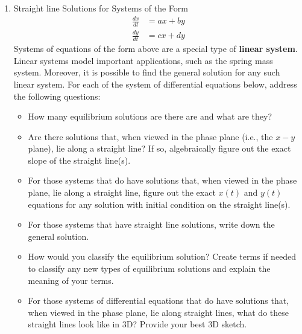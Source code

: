\begin{enumerate}[resume]
\begin{enumerate}
\item Straight line Solutions for Systems of the Form 
\begin{align*}
\frac{dx}{dt}&=ax+by\\
\frac{dy}{dt}&=cx+dy
\end{align*}
Systems of equations of the form above are a special type of \textbf{linear system}. Linear systems model important applications, such as the spring mass system. Moreover, it is possible to find the general solution for any such linear system. For each of the system of differential equations below, address the following questions: \label{12HWproblem2}
\begin{itemize}

\item	How many equilibrium solutions are there are and what are they?

\item	Are there solutions that, when viewed in the phase plane (i.e., the $ x-y$ plane), lie along a straight line? If so, algebraically figure out the exact slope of the straight line(s). 

\item	For those systems that do have solutions that, when viewed in the phase plane, lie along a straight line, figure out the exact $x(t)$ and $y(t)$ equations for any solution with initial condition on the straight line(s). 

\item	For those systems that have straight line solutions, write down the general solution.

\item	How would you classify the equilibrium solution? Create terms if needed to classify any new types of equilibrium solutions and explain the meaning of your terms.

\item	For those systems of differential equations that do have solutions that, when viewed in the phase plane, lie along straight lines, what do these straight lines look like in 3D? Provide your best 3D sketch.

\end{itemize}


\end{enumerate}
\end{enumerate}
